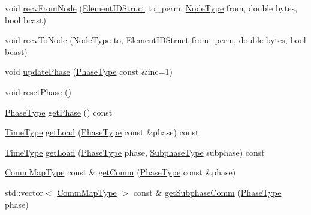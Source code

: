\begin{DoxyCompactItemize}
void \hyperlink{structvt_1_1elm_1_1_element_l_b_data_aadd1fa3ab5c86886b970989d05286901}{recv\+From\+Node} (\hyperlink{structvt_1_1elm_1_1_element_i_d_struct}{Element\+I\+D\+Struct} to\+\_\+perm, \hyperlink{namespacevt_a866da9d0efc19c0a1ce79e9e492f47e2}{Node\+Type} from, double bytes, bool bcast)
\item 
void \hyperlink{structvt_1_1elm_1_1_element_l_b_data_ac9fefbad98060214e8720b46a5a8aaf6}{recv\+To\+Node} (\hyperlink{namespacevt_a866da9d0efc19c0a1ce79e9e492f47e2}{Node\+Type} to, \hyperlink{structvt_1_1elm_1_1_element_i_d_struct}{Element\+I\+D\+Struct} from\+\_\+perm, double bytes, bool bcast)
\item 
void \hyperlink{structvt_1_1elm_1_1_element_l_b_data_acb64ab9bcd98f12bd5cae08ebbefd943}{update\+Phase} (\hyperlink{namespacevt_a46ce6733d5cdbd735d561b7b4029f6d7}{Phase\+Type} const \&inc=1)
\item 
void \hyperlink{structvt_1_1elm_1_1_element_l_b_data_aa6547718a29385a1600e29ae4b0792dd}{reset\+Phase} ()
\item 
\hyperlink{namespacevt_a46ce6733d5cdbd735d561b7b4029f6d7}{Phase\+Type} \hyperlink{structvt_1_1elm_1_1_element_l_b_data_ab3e11f3720c9c8ce83b23610eccbef08}{get\+Phase} () const
\item 
\hyperlink{namespacevt_a876a9d0cd5a952859c72de8a46881442}{Time\+Type} \hyperlink{structvt_1_1elm_1_1_element_l_b_data_a3216bed5134fde4e1b363c92130aab88}{get\+Load} (\hyperlink{namespacevt_a46ce6733d5cdbd735d561b7b4029f6d7}{Phase\+Type} const \&phase) const
\item 
\hyperlink{namespacevt_a876a9d0cd5a952859c72de8a46881442}{Time\+Type} \hyperlink{structvt_1_1elm_1_1_element_l_b_data_a982939f9ddd9422c5ec9654112084108}{get\+Load} (\hyperlink{namespacevt_a46ce6733d5cdbd735d561b7b4029f6d7}{Phase\+Type} phase, \hyperlink{namespacevt_ae78cbfdf1e57470e33eedb074f2beeba}{Subphase\+Type} subphase) const
\item 
\hyperlink{namespacevt_1_1elm_a38487cb8896b9b4763efa9022fab560e}{Comm\+Map\+Type} const  \& \hyperlink{structvt_1_1elm_1_1_element_l_b_data_a9a59e8546283b731702d07f2360d527d}{get\+Comm} (\hyperlink{namespacevt_a46ce6733d5cdbd735d561b7b4029f6d7}{Phase\+Type} const \&phase)
\item 
std\+::vector$<$ \hyperlink{namespacevt_1_1elm_a38487cb8896b9b4763efa9022fab560e}{Comm\+Map\+Type} $>$ const  \& \hyperlink{structvt_1_1elm_1_1_element_l_b_data_a32d430c814238614d01cc4bc87c3b22b}{get\+Subphase\+Comm} (\hyperlink{namespacevt_a46ce6733d5cdbd735d561b7b4029f6d7}{Phase\+Type} phase)
\item 

\end{DoxyCompactItemize}
